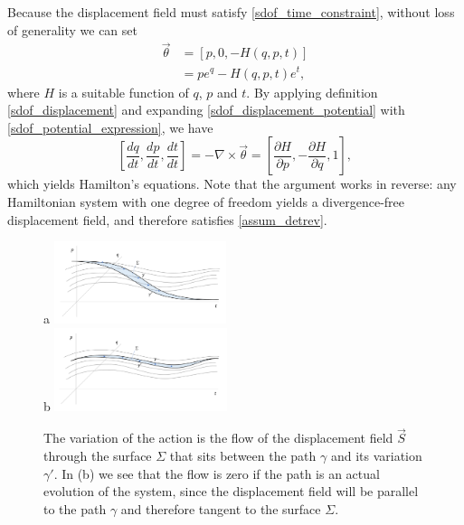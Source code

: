 \documentclass[fleqn,10pt]{wlscirep}
\begin{document}
Because the displacement field must satisfy \ref{sdof_time_constraint}, without loss of generality we can set
\begin{equation}\label{sdof_potential_expression}
\begin{aligned}
	\vec{\theta} &= [p, 0, -H(q,p,t)] \\
	&= p e^q - H(q,p,t) e^t,
\end{aligned}
\end{equation}
where $H$ is a suitable function of $q$, $p$ and $t$. By applying definition \ref{sdof_displacement} and expanding \ref{sdof_displacement_potential} with \ref{sdof_potential_expression}, we have
\begin{equation}\label{sdof_Ham_eq}
	\left[ \frac{dq}{dt},\frac{dp}{dt},\frac{dt}{dt} \right] = - \nabla \times \vec{\theta} = \left[ \frac{\partial H}{\partial p},-\frac{\partial H}{\partial q}, 1 \right],
\end{equation}
which yields Hamilton's equations. Note that the argument works in reverse: any Hamiltonian system with one degree of freedom yields a divergence-free displacement field, and therefore satisfies \ref{assum_detrev}.

\begin{figure}
	a \includegraphics[width = 0.45\textwidth]{ActionNonOptimized.png} \\
	b \includegraphics[width = 0.45\textwidth]{ActionOptimized.png}
	\caption{\footnotesize{The variation of the action is the flow of the displacement field $\vec{S}$ through the surface $\Sigma$ that sits between the path $\gamma$ and its variation $\gamma'$. In (b) we see that the flow is zero if the path is an actual evolution of the system, since the displacement field will be parallel to the path $\gamma$ and therefore tangent to the surface $\Sigma$.}}\label{fig_action}
\end{figure}
\end{document}
